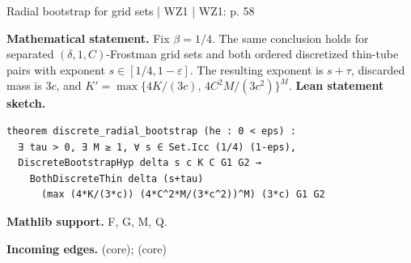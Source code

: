 \documentclass[10pt,a4paper]{article}
\newcommand{\nodecard}[1]{\hyperlink{node-#1}{\texttt{\detokenize{#1}}}}
\begin{document}
\begin{minipage}{\linewidth}
\hypertarget{node-P8_6p}{}
\begin{tcolorbox}[colback=white,colframe=radialfg,colbacktitle=radialbg,coltitle=ink,boxrule=0.45pt,arc=1.6mm,left=3mm,right=3mm,top=2mm,bottom=2mm,title={\sffamily\bfseries WZ1 Proposition 8.6' \hfill \texttt{P8\_6p}}]
{\sffamily\small\color{muted}Radial bootstrap for grid sets | WZ1 | WZ1: p. 58}\par
\textbf{Mathematical statement.} Fix $\beta=1/4$. The same conclusion holds for separated $(\delta,1,C)$-Frostman grid sets and both ordered discretized thin-tube pairs with exponent $s\in[1/4,1-\varepsilon]$.
The resulting exponent is $s+\tau$, discarded mass is $3c$, and
$K'=\max\{4K/(3c),\,4C^2M/(3c^2)\}^{M}$.
\smallskip\textbf{Lean statement sketch.}
\begin{Verbatim}[fontsize=\small,breaklines=true,breakanywhere=true,tabsize=2]
theorem discrete_radial_bootstrap (he : 0 < eps) :
  ∃ tau > 0, ∃ M ≥ 1, ∀ s ∈ Set.Icc (1/4) (1-eps),
  DiscreteBootstrapHyp delta s c K C G1 G2 →
    BothDiscreteThin delta (s+tau)
      (max (4*K/(3*c)) (4*C^2*M/(3*c^2))^M) (3*c) G1 G2
\end{Verbatim}
{\footnotesize\textbf{Mathlib support.} F, G, M, Q.\par
\textbf{Incoming edges.} \nodecard{P8_6} (core); \nodecard{L8_3} (core)\par}

\end{tcolorbox}\end{minipage}\par\medskip
\end{document}
